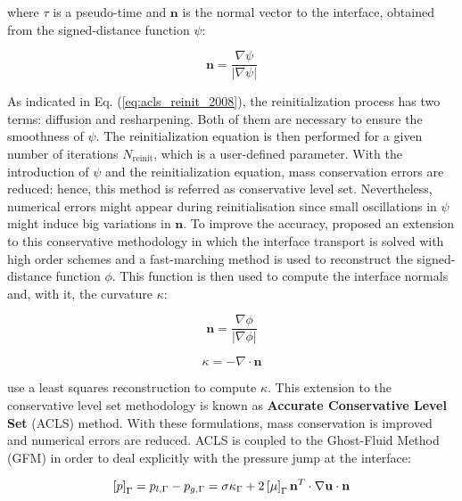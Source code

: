 where $\tau$ is a pseudo-time and $\textbf{n}$ is the normal vector to the interface, obtained from the signed-distance function $\psi$:

\begin{equation}
\textbf{n} = \frac{\nabla \psi}{| \nabla \psi |} 
\end{equation}


As indicated in Eq. (\ref{eq:acls_reinit_2008}), the reinitialization process has two terms: diffusion and resharpening. Both of them are necessary to ensure the smoothness of $\psi$. The reinitialization equation is then performed for a given number of iterations $N_\mathrm{reinit}$, which is a user-defined parameter. With the introduction of $\psi$ and the reinitialization equation, mass conservation errors are reduced: hence, this method is referred as conservative level set. Nevertheless, numerical errors might appear during reinitialisation since small oscillations in $\psi$ might induce big variations in $\textbf{n}$. To improve the accuracy,  proposed an extension to this conservative methodology in which the interface transport is solved with high order schemes and a fast-marching method is used to reconstruct the signed-distance function $\phi$. This function is then used to compute the interface normals and, with it, the curvature $\kappa$: 

\begin{equation}
\textbf{n} = \frac{\nabla \phi}{| \nabla \phi |} 
\end{equation}

\begin{equation}
\kappa = - \nabla \cdot \textbf{n}
\end{equation}

 use a least squares reconstruction to compute $\kappa$. This extension to the conservative level set methodology is known as \textbf{Accurate Conservative Level Set} (ACLS) method. With these formulations, mass conservation is improved and numerical errors are reduced. ACLS is coupled to the Ghost-Fluid Method (GFM)  in order to deal explicitly with the pressure jump at the interface:

\begin{equation}
    \left[ p \right]_{\scriptsize{\Gamma}} = p_{l,{\scriptsize{\Gamma}}} - p_{g,{\scriptsize{\Gamma}}}  = \sigma \kappa_{\scriptsize{\Gamma}} + 2 \left[ \mu \right]_{\scriptsize{\Gamma}} \textbf{n}^T \cdot \nabla \textbf{u} \cdot \textbf{n}
\end{equation}

